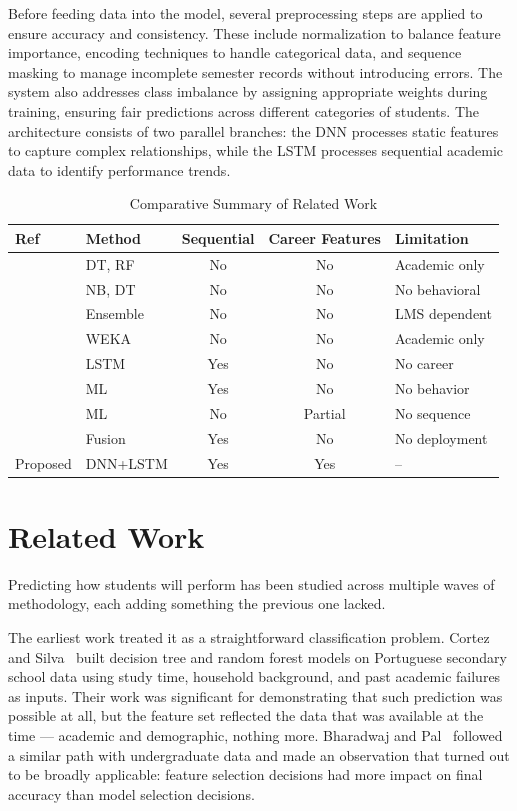 \documentclass[conference]{IEEEtran}
\begin{document}
Before feeding data into the model, several preprocessing steps are applied to ensure accuracy and consistency. These include normalization to balance feature importance, encoding techniques to handle categorical data, and sequence masking to manage incomplete semester records without introducing errors. The system also addresses class imbalance by assigning appropriate weights during training, ensuring fair predictions across different categories of students. The architecture consists of two parallel branches: the DNN processes static features to capture complex relationships, while the LSTM processes sequential academic data to identify performance trends.
\begin{table}[t]
\caption{Comparative Summary of Related Work}
\label{tab:litreview}
\centering
\renewcommand{\arraystretch}{1.3}
\begin{tabular}{|p{}|p{}|c|c|p{}|}
\hline
Ref & Method & Sequential & Career Features & Limitation \\ \hline
\cite{R1} & DT, RF & No & No & Academic only \\ \hline
\cite{R8} & NB, DT & No & No & No behavioral \\ \hline
\cite{R2} & Ensemble & No & No & LMS dependent \\ \hline
\cite{R3} & WEKA & No & No & Academic only \\ \hline
\cite{R6} & LSTM & Yes & No & No career \\ \hline
\cite{R7} & ML & Yes & No & No behavior \\ \hline
\cite{R10} & ML & No & Partial & No sequence \\ \hline
\cite{R15} & Fusion & Yes & No & No deployment \\ \hline
Proposed & DNN+LSTM & Yes & Yes & -- \\ \hline
\end{tabular}
\end{table}
\section{Related Work}
\label{sec:related}

Predicting how students will perform has been studied across multiple waves of methodology, each adding something the previous one lacked.

The earliest work treated it as a straightforward classification problem. Cortez and Silva~\cite{R1} built decision tree and random forest models on Portuguese secondary school data using study time, household background, and past academic failures as inputs. Their work was significant for demonstrating that such prediction was possible at all, but the feature set reflected the data that was available at the time — academic and demographic, nothing more. Bharadwaj and Pal~\cite{R8} followed a similar path with undergraduate data and made an observation that turned out to be broadly applicable: feature selection decisions had more impact on final accuracy than model selection decisions.
\end{document}
